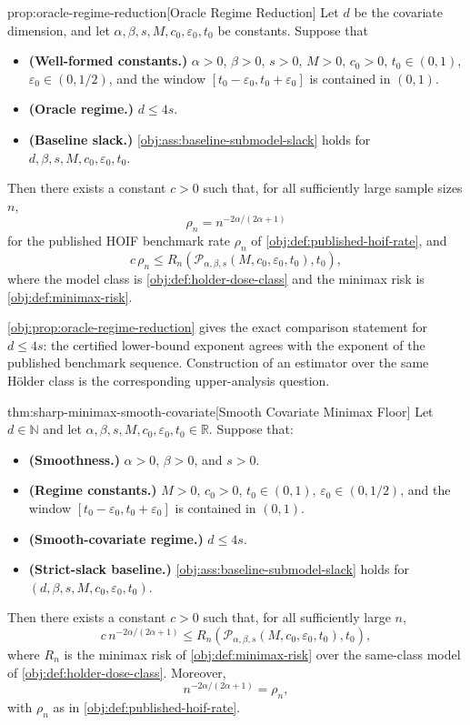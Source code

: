 \begin{propositionv}{prop:oracle-regime-reduction}[Oracle Regime Reduction]
Let \(d\) be the covariate dimension, and let \(\alpha,\beta,s,M,c_0,\varepsilon_0,t_0\) be constants. Suppose that
\begin{itemize}
\item \textbf{(Well-formed constants.)} \(\alpha>0\), \(\beta>0\), \(s>0\), \(M>0\), \(c_0>0\), \(t_0\in(0,1)\), \(\varepsilon_0\in(0,1/2)\), and the window \([t_0-\varepsilon_0,t_0+\varepsilon_0]\) is contained in \((0,1)\).
\item \textbf{(Oracle regime.)} \(d\le 4s\).
\item \textbf{(Baseline slack.)} \cref{obj:ass:baseline-submodel-slack} holds for \(d,\beta,s,M,c_0,\varepsilon_0,t_0\).
\end{itemize}
Then there exists a constant \(c>0\) such that, for all sufficiently large sample sizes \(n\),
\[
\rho_n
=
n^{-2\alpha/(2\alpha+1)}
\]
for the published HOIF benchmark rate \(\rho_n\) of \cref{obj:def:published-hoif-rate}, and
\[
c\,\rho_n
\le
R_n\!\left(\mathcal P_{\alpha,\beta,s}(M,c_0,\varepsilon_0,t_0),t_0\right),
\]
where the model class is \cref{obj:def:holder-dose-class} and the minimax risk is \cref{obj:def:minimax-risk}.
\end{propositionv}

\cref{obj:prop:oracle-regime-reduction} gives the exact comparison statement for \(d\le 4s\): the certified lower-bound exponent agrees with the exponent of the published benchmark sequence. Construction of an estimator over the same Hölder class is the corresponding upper-analysis question.

\begin{theoremv}{thm:sharp-minimax-smooth-covariate}[Smooth Covariate Minimax Floor]
Let \(d\in\mathbb N\) and let \(\alpha,\beta,s,M,c_0,\varepsilon_0,t_0\in\mathbb R\). Suppose that:
\begin{itemize}
\item \textbf{(Smoothness.)} \(\alpha>0\), \(\beta>0\), and \(s>0\).
\item \textbf{(Regime constants.)} \(M>0\), \(c_0>0\), \(t_0\in(0,1)\), \(\varepsilon_0\in(0,1/2)\), and the window \([t_0-\varepsilon_0,t_0+\varepsilon_0]\) is contained in \((0,1)\).
\item \textbf{(Smooth-covariate regime.)} \(d\le 4s\).
\item \textbf{(Strict-slack baseline.)} \cref{obj:ass:baseline-submodel-slack} holds for \((d,\beta,s,M,c_0,\varepsilon_0,t_0)\).
\end{itemize}
Then there exists a constant \(c>0\) such that, for all sufficiently large \(n\),
\[
c\,n^{-2\alpha/(2\alpha+1)}
\le
R_n\!\left(
\mathcal P_{\alpha,\beta,s}(M,c_0,\varepsilon_0,t_0),t_0
\right),
\]
where \(R_n\) is the minimax risk of \cref{obj:def:minimax-risk} over the same-class model of \cref{obj:def:holder-dose-class}. Moreover,
\[
n^{-2\alpha/(2\alpha+1)}
=
\rho_n,
\]
with \(\rho_n\) as in \cref{obj:def:published-hoif-rate}.
\end{theoremv}

